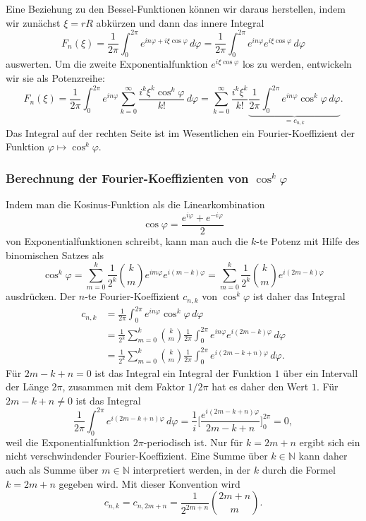 Eine Beziehung zu den Bessel-Funktionen können wir daraus herstellen,
indem wir zunächst $\xi = rR$ abkürzen und dann das innere Integral
\begin{equation}
F_n(\xi)
=
\frac{1}{2\pi}
\int_{0}^{2\pi}
e^{in\varphi+i\xi\cos\varphi}
\,d\varphi
=
\frac{1}{2\pi}
\int_{0}^{2\pi}
e^{in\varphi}e^{i\xi\cos\varphi}
\,d\varphi
\label{buch:fourier:eqn:Fncosphi}
\end{equation}
auswerten.
Um die zweite Exponentialfunktion $e^{i\xi\cos\varphi}$ los zu werden,
entwickeln wir sie als Potenzreihe:
\[
F_n(\xi)
=
\frac{1}{2\pi}
\int_0^{2\pi}
e^{in\varphi}
\sum_{k=0}^\infty
\frac{
i^k\xi^k \cos^k\varphi
}{k!}
\,d\varphi
=
\sum_{k=0}^\infty
\frac{i^k\xi^k}{k!}
\underbrace{
\frac{1}{2\pi}
\int_0^{2\pi}
e^{in\varphi}
\cos^k\varphi
\,d\varphi}_{\displaystyle =c_{n,k}}.
\]
Das Integral auf der rechten Seite ist im Wesentlichen ein
Fourier-Koeffizient der Funktion $\varphi\mapsto \cos^k\varphi$.

%
%
\subsubsection{Berechnung der Fourier-Koeffizienten von $\cos^k\varphi$}
Indem man die Kosinus-Funktion als die Linearkombination
\[
\cos\varphi
=
\frac{e^{i\varphi}+e^{-i\varphi}}2
\]
von Exponentialfunktionen schreibt, kann man auch die $k$-te Potenz 
mit Hilfe des binomischen Satzes als
%
\[
\cos^k\varphi
=
\sum_{m=0}^k
\frac{1}{2^k}
\binom{k}{m}
e^{im\varphi}e^{i(m-k)\varphi}
=
\sum_{m=0}^k
\frac{1}{2^k}
\binom{k}{m}
e^{i(2m-k)\varphi}
\]
ausdrücken.
Der $n$-te Fourier-Koeffizient $c_{n,k}$ von $\cos^k\varphi$ ist daher
das Integral
\begin{align*}
c_{n,k}
&=
\frac{1}{2\pi}
\int_0^{2\pi}
e^{in\varphi}\cos^k\varphi\,d\varphi
\\
&=
\frac{1}{2^k}
\sum_{m=0}^k
\binom{k}{m}
\frac{1}{2\pi}
\int_0^{2\pi}
e^{in\varphi}e^{i(2m-k)\varphi}
\,d\varphi
\\
&=
\frac{1}{2^k}
\sum_{m=0}^k
\binom{k}{m}
\frac{1}{2\pi}
\int_0^{2\pi}
e^{i(2m-k+n)\varphi}
\,d\varphi.
\end{align*}
Für $2m-k+n=0$ ist das Integral ein Integral der Funktion $1$ über
ein Intervall der Länge $2\pi$, zusammen mit dem Faktor $1/2\pi$ hat
es daher den Wert $1$.
Für $2m-k+n\ne 0$ ist das Integral 
\[
\frac{1}{2\pi}
\int_0^{2\pi}
e^{i(2m-k+n)\varphi}
\,d\varphi
=
\frac{1}{i}
\biggl[
\frac{e^{i(2m-k+n)\varphi}}{2m-k+n}
\biggr]_0^{2\pi}
=
0,
\]
weil die Exponentialfunktion $2\pi$-periodisch ist.
Nur für $k=2m+n$ ergibt sich ein nicht verschwindender
Fourier-Koeffizient.
Eine Summe über $k\in\mathbb{N}$ kann daher auch als Summe über
$m\in\mathbb{N}$ interpretiert werden, in der $k$ durch die Formel
$k=2m+n$ gegeben wird.
Mit dieser Konvention wird
\begin{equation}
c_{n,k}
=
c_{n,2m+n}
=
\frac{1}{2^{2m+n}}
\binom{2m+n}{m}.
\label{buch:fourier:eqn:cnk}
\end{equation}

